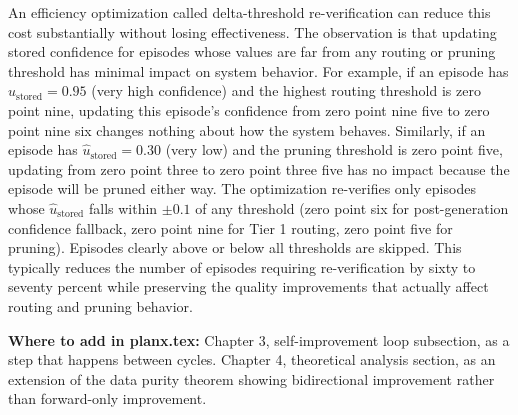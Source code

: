 \documentclass[11pt,a4paper]{article}
\newcommand{\ustored}{\hat{u}_{\text{stored}}}
\begin{document}
{An efficiency optimization called delta-threshold re-verification can reduce this cost substantially without losing effectiveness. The observation is that updating stored confidence for episodes whose values are far from any routing or pruning threshold has minimal impact on system behavior. For example, if an episode has $\ustored = 0.95$ (very high confidence) and the highest routing threshold is zero point nine, updating this episode's confidence from zero point nine five to zero point nine six changes nothing about how the system behaves. Similarly, if an episode has $\ustored = 0.30$ (very low) and the pruning threshold is zero point five, updating from zero point three to zero point three five has no impact because the episode will be pruned either way. The optimization re-verifies only episodes whose $\ustored$ falls within $\pm 0.1$ of any threshold (zero point six for post-generation confidence fallback, zero point nine for Tier 1 routing, zero point five for pruning). Episodes clearly above or below all thresholds are skipped. This typically reduces the number of episodes requiring re-verification by sixty to seventy percent while preserving the quality improvements that actually affect routing and pruning behavior.

\textbf{Where to add in planx.tex:} Chapter 3, self-improvement loop subsection, as a step that happens between cycles. Chapter 4, theoretical analysis section, as an extension of the data purity theorem showing bidirectional improvement rather than forward-only improvement.
}
\end{document}
